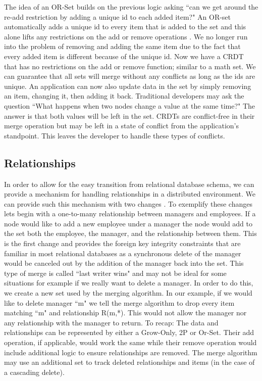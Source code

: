 \documentclass{article}
\begin{document}
\begin{multicols}{2}
\begin{refsection}
The idea of an OR-Set builds on the previous logic asking ``can we get
around the re-add restriction by adding a unique id to each added item?"
An OR-set automatically adds a unique id to every item that is added to
the set and this alone lifts any restrictions on the add or remove
operations \cite{shapiro_comprehensive_2011}. We no longer run into the
problem of removing and adding the same item due to the fact that every
added item is different because of the unique id. Now we have a CRDT
that has no restrictions on the add or remove function; similar to a
math set. We can guarantee that all sets will merge without any conflicts
as long as the ids are unique. An application can now also update data in
the set by simply removing an item, changing it, then adding it back.
Traditional developers may ask the question ``What happens when two nodes
change a value at the same time?" The answer is that both values will be
left in the set. CRDTs are conflict-free in their merge operation but
may be left in a state of conflict from the application's standpoint.
This leaves the developer to handle these types of conflicts.

\subsection*{Relationships}

In order to allow for the easy transition from relational database
schema, we can provide a mechanism for handling relationships in a
distributed environment. We can provide such this mechanism with two
changes \cite{balegas_making_2016}. To exemplify these changes lets
begin with a one-to-many relationship between managers and employees.
If a node would like to add a new employee under a manager the node
would add to the set both the employee, the manager, and the
relationship between them. This is the first change and provides the
foreign key integrity constraints that are familiar in most relational
databases as a synchronous delete of the manager would be canceled out
by the addition of the manager back into the set. This type of merge is
called ``last writer wins" and may not be ideal for some situations for
example if we really want to delete a manager. In order to do this, we
create a new set used by the merging algorithm. In our example, if we
would like to delete manager ``m" we tell the merge algorithm to drop
every item matching ``m" and relationship R(m,*). This would not allow
the manager nor any relationship with the manager to return. To recap:
The data and relationships can be represented by either a Grow-Only, 2P
or Or-Set. Their add operation, if applicable, would work the same while
their remove operation would include additional logic to ensure
relationships are removed. The merge algorithm may use an additional set
to track deleted relationships and items (in the case of a cascading
delete).


\end{refsection}
\end{multicols}
\end{document}
